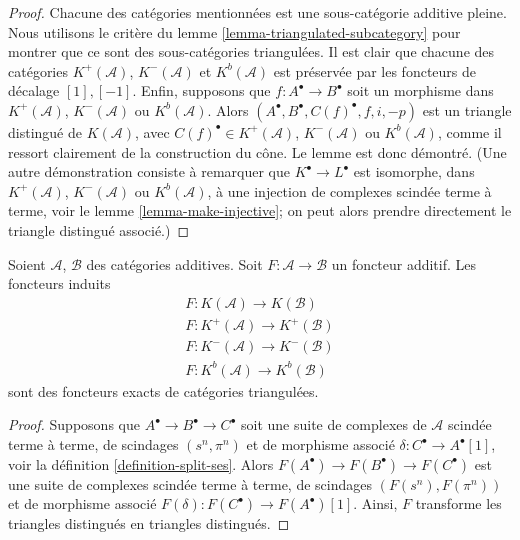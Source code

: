 \begin{proof}
Chacune des catégories mentionnées est une sous-catégorie additive pleine.
Nous utilisons le critère du lemme \ref{lemma-triangulated-subcategory} pour
montrer que ce sont des sous-catégories triangulées. Il est clair que chacune
des catégories $K^{+}(\mathcal{A})$, $K^{-}(\mathcal{A})$ et
$K^b(\mathcal{A})$ est préservée par les foncteurs de décalage $[1], [-1]$.
Enfin, supposons que $f : A^\bullet \to B^\bullet$ soit un morphisme dans
$K^{+}(\mathcal{A})$, $K^{-}(\mathcal{A})$ ou $K^b(\mathcal{A})$.
Alors $(A^\bullet, B^\bullet, C(f)^\bullet, f, i, -p)$ est un triangle
distingué de $K(\mathcal{A})$, avec
$C(f)^\bullet \in K^{+}(\mathcal{A})$, $K^{-}(\mathcal{A})$ ou
$K^b(\mathcal{A})$, comme il ressort clairement de la construction du cône.
Le lemme est donc démontré. (Une autre démonstration consiste à remarquer que
$K^\bullet \to L^\bullet$ est isomorphe, dans $K^{+}(\mathcal{A})$,
$K^{-}(\mathcal{A})$ ou $K^b(\mathcal{A})$, à une injection de complexes
scindée terme à terme, voir le lemme \ref{lemma-make-injective}; on peut alors
prendre directement le triangle distingué associé.)
\end{proof}

\begin{lemma}
\label{lemma-additive-exact-homotopy-category}
Soient $\mathcal{A}$, $\mathcal{B}$ des catégories additives. Soit
$F : \mathcal{A} \to \mathcal{B}$ un foncteur additif. Les foncteurs induits
$$
\begin{matrix}
F : K(\mathcal{A}) \longrightarrow K(\mathcal{B}) \\
F : K^{+}(\mathcal{A}) \longrightarrow K^{+}(\mathcal{B}) \\
F : K^{-}(\mathcal{A}) \longrightarrow K^{-}(\mathcal{B}) \\
F : K^b(\mathcal{A}) \longrightarrow K^b(\mathcal{B})
\end{matrix}
$$
sont des foncteurs exacts de catégories triangulées.
\end{lemma}

\begin{proof}
Supposons que $A^\bullet \to B^\bullet \to C^\bullet$ soit une suite de
complexes de $\mathcal{A}$ scindée terme à terme, de scindages
$(s^n, \pi^n)$ et de morphisme associé
$\delta : C^\bullet \to A^\bullet[1]$, voir la
définition \ref{definition-split-ses}. Alors
$F(A^\bullet) \to F(B^\bullet) \to F(C^\bullet)$ est une suite de complexes
scindée terme à terme, de scindages $(F(s^n), F(\pi^n))$ et de morphisme
associé $F(\delta) : F(C^\bullet) \to F(A^\bullet)[1]$. Ainsi, $F$ transforme
les triangles distingués en triangles distingués.
\end{proof}

